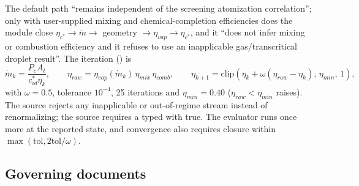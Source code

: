 The default path ``remains independent of the screening atomization correlation'';
only with user-supplied mixing and chemical-completion efficiencies does the
module close $\eta_{c^*}\rightarrow\dot m\rightarrow$ geometry $\rightarrow\eta_{vap}\rightarrow\eta_{c^*}$,
and it ``does not infer mixing or combustion efficiency and it refuses to use an
inapplicable gas/transcritical droplet result''. The iteration () is
\begin{equation*}
\dot m_k=\frac{P_cA_t}{c^*_{id}\eta_k},\qquad
\eta_{raw}=\eta_{vap}(\dot m_k)\,\eta_{mix}\,\eta_{comb},\qquad
\eta_{k+1}=\mathrm{clip}\!\left(\eta_k+\omega(\eta_{raw}-\eta_k),\,\eta_{min},\,1\right),
\end{equation*}
with $\omega=0.5$, tolerance $10^{-4}$, 25 iterations and $\eta_{min}=0.40$
($\eta_{raw}<\eta_{min}$ raises). The  source rejects any
inapplicable or out-of-regime stream instead of renormalizing; the
 source requires a typed  with
 true. The evaluator runs once more at the reported state,
and convergence also requires closure within $\max(\mathrm{tol},2\mathrm{tol}/\omega)$.

\subsection{Governing documents}


